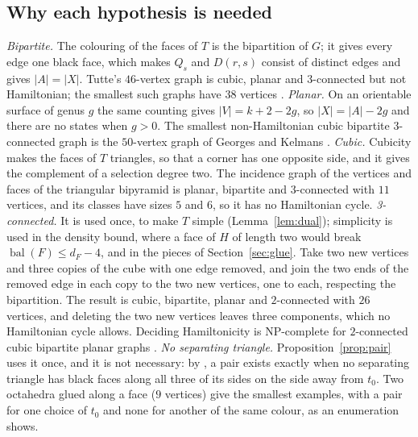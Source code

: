 \documentclass[10pt]{amsart}
\numberwithin{equation}{section}
\theoremstyle{definition}
\theoremstyle{remark}
\newcommand{\T}{T}
\newcommand{\bal}{\operatorname{bal}}
\begin{document}
\subsection*{Why each hypothesis is needed}
\emph{Bipartite.} The colouring of the faces of $\T$ is the bipartition of $G$; it gives every edge one black face, which makes $Q_s$ and $D(r,s)$ consist of distinct edges and gives $|A|=|X|$.
Tutte's $46$-vertex graph \cite{tutte1946} is cubic, planar and $3$-connected but not Hamiltonian; the smallest such graphs have $38$ vertices \cite{holton-mckay1988}.
\emph{Planar.} On an orientable surface of genus $g$ the same counting gives $|V|=k+2-2g$, so $|X|=|A|-2g$ and there are no states when $g>0$. The smallest non-Hamiltonian cubic bipartite $3$-connected graph is the $50$-vertex graph of Georges and Kelmans \cite{georges1989,bgm2021}.
\emph{Cubic.} Cubicity makes the faces of $\T$ triangles, so that a corner has one opposite side, and it gives the complement of a selection degree two. The incidence graph of the vertices and faces of the triangular bipyramid is planar, bipartite and $3$-connected with $11$ vertices, and its classes have sizes $5$ and $6$, so it has no Hamiltonian cycle.
\emph{3-connected.} It is used once, to make $\T$ simple (Lemma~\ref{lem:dual}); simplicity is used in the density bound, where a face of $H$ of length two would break $\bal(F)\le d_F-4$, and in the pieces of Section~\ref{sec:glue}. Take two new vertices and three copies of the cube with one edge removed, and join the two ends of the removed edge in each copy to the two new vertices, one to each, respecting the bipartition. The result is cubic, bipartite, planar and $2$-connected with $26$ vertices, and deleting the two new vertices leaves three components, which no Hamiltonian cycle allows. Deciding Hamiltonicity is NP-complete for $2$-connected cubic bipartite planar graphs \cite{ans1980}.
\emph{No separating triangle.} Proposition~\ref{prop:pair} uses it once, and it is not necessary: by \cite[Theorem~1.2]{constructive2026}, a pair exists exactly when no separating triangle has black faces along all three of its sides on the side away from $t_0$. Two octahedra glued along a face ($9$ vertices) give the smallest examples, with a pair for one choice of $t_0$ and none for another of the same colour, as an enumeration shows.
\end{document}
